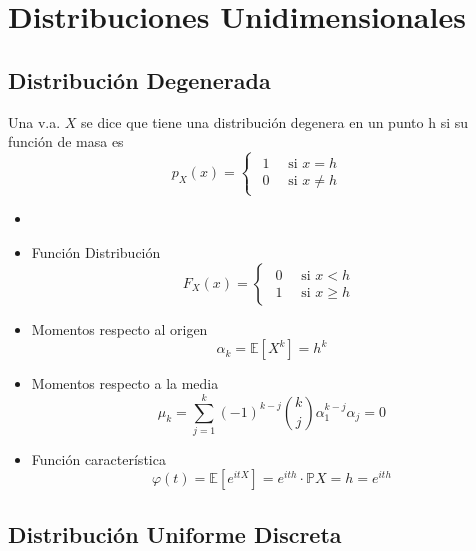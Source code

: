 \chapter{Distribuciones Unidimensionales}

\section{Distribución Degenerada}

\begin{defn}
  Una v.a. $X$ se dice que tiene una distribución degenera en un punto h si su función de masa es
  \[ 
    p_{X}(x) =
    \begin{cases}
      \begin{aligned}
        1 \quad \text{ si } x = h \\
        0 \quad \text{ si } x \neq h
      \end{aligned}
    \end{cases}
  \] 
\end{defn}

\begin{prop}[Degenerada]
  \begin{itemize}
    \item []
    \item Función Distribución 
      \[ 
        F_{X}(x) =
        \begin{cases}
          \begin{aligned}
            0 \quad \text{ si } x < h \\
            1 \quad \text{ si } x \geq h
          \end{aligned}
        \end{cases} 
      \] 
    \item Momentos respecto al origen
      \[ 
        \alpha_{k} = \mathbb{E} [ X^{k} ] = h^{k}
      \] 
    \item Momentos respecto a la media
      \[ 
        \mu_{k}  = \sum_{j = 1}^{k} (-1)^{k - j} \binom{k}{j} \alpha^{k - j}_{1} \alpha_{j} = 0
      \] 
    \item Función característica
      \[ 
        \varphi(t) = \mathbb{E} [ e^{itX} ] = e^{ith} \cdot \mathbb{P} { X = h } = e^{ith} 
      \] 
  \end{itemize}
\end{prop}

\section{Distribución Uniforme Discreta}

